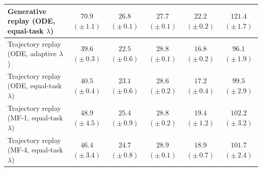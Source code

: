 \begin{table}[t]
{\begin{tabular}{@{}lccccc@{}}
Generative replay (ODE, equal-task $\lambda$) & $70.9$ {\scriptsize $(\pm\,1.1)$} & $26.8$ {\scriptsize $(\pm\,0.1)$} & $27.7$ {\scriptsize $(\pm\,0.1)$} & $22.2$ {\scriptsize $(\pm\,0.2)$} & $121.4$ {\scriptsize $(\pm\,1.7)$} \\
\midrule
\rowcolor{trajectoryrow} Trajectory replay (ODE, adaptive $\lambda$) & $39.6$ {\scriptsize $(\pm\,0.3)$} & $\mathbf{22.5}$ {\scriptsize $(\pm\,0.6)$} & $28.8$ {\scriptsize $(\pm\,0.1)$} & $\mathbf{16.8}$ {\scriptsize $(\pm\,0.2)$} & $\mathbf{96.1}$ {\scriptsize $(\pm\,1.9)$} \\
\rowcolor{trajectoryrow} Trajectory replay (ODE, equal-task $\lambda$) & $40.5$ {\scriptsize $(\pm\,0.4)$} & $23.1$ {\scriptsize $(\pm\,0.6)$} & $28.6$ {\scriptsize $(\pm\,0.2)$} & $17.2$ {\scriptsize $(\pm\,0.4)$} & $99.5$ {\scriptsize $(\pm\,2.9)$} \\
\rowcolor{trajectoryrow} Trajectory replay (MF-1, equal-task $\lambda$) & $48.9$ {\scriptsize $(\pm\,4.5)$} & $25.4$ {\scriptsize $(\pm\,0.9)$} & $28.8$ {\scriptsize $(\pm\,0.2)$} & $19.4$ {\scriptsize $(\pm\,1.2)$} & $102.2$ {\scriptsize $(\pm\,3.2)$} \\
\rowcolor{trajectoryrow} Trajectory replay (MF-4, equal-task $\lambda$) & $46.4$ {\scriptsize $(\pm\,3.4)$} & $24.7$ {\scriptsize $(\pm\,0.8)$} & $28.9$ {\scriptsize $(\pm\,0.1)$} & $18.9$ {\scriptsize $(\pm\,0.7)$} & $101.7$ {\scriptsize $(\pm\,2.4)$} \\
\bottomrule
\end{tabular}%
}
\end{table}

